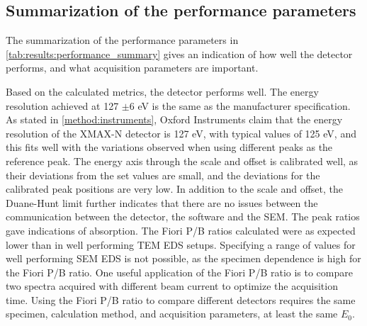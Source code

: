 \subsection{Summarization of the performance parameters}
\label{discussion:summarization_of_the_performance_parameters}


The summarization of the performance parameters in \cref{tab:results:performance_summary} gives an indication of how well the detector performs, and what acquisition parameters are important.


Based on the calculated metrics, the detector performs well.
The energy resolution achieved at 127 $\pm$6 eV is the same as the manufacturer specification.
As stated in \cref{method:instruments}, Oxford Instruments claim that the energy resolution of the XMAX-N detector is 127 eV\cite{oxford_xmax_80}, with typical values of 125 eV, and this fits well with the variations observed when using different peaks as the reference peak.
The energy axis through the scale and offset is calibrated well, as their deviations from the set values are small, and the deviations for the calibrated peak positions are very low.
In addition to the scale and offset, the Duane-Hunt limit further indicates that there are no issues between the communication between the detector, the software and the SEM.
The peak ratios gave indications of absorption.
The Fiori P/B ratios calculated were as expected lower than in well performing TEM EDS setups.
Specifying a range of values for well performing SEM EDS is not possible, as the specimen dependence is high for the Fiori P/B ratio.
One useful application of the Fiori P/B ratio is to compare two spectra acquired with different beam current to optimize the acquisition time.
Using the Fiori P/B ratio to compare different detectors requires the same specimen, calculation method, and acquisition parameters, at least the same $E_0$.


